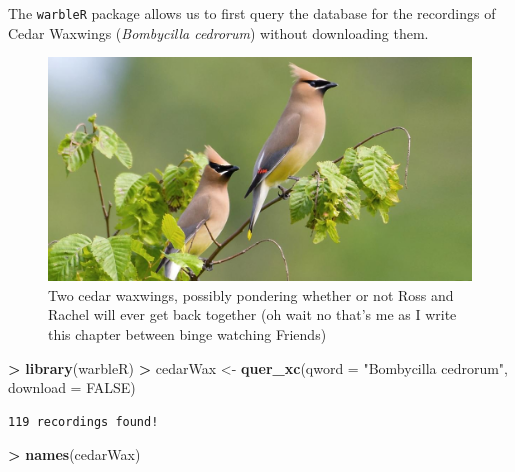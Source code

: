 \documentclass[
]{krantz}
\makeatletter
\newenvironment{Shaded}{\begin{snugshade}}{\end{snugshade}}
\newcommand{\DataTypeTok}[1]{\textcolor[rgb]{0.27,0.27,0.27}{#1}}
\newcommand{\KeywordTok}[1]{\textcolor[rgb]{0.27,0.27,0.27}{\textbf{#1}}}
\newcommand{\NormalTok}[1]{#1}
\newcommand{\OperatorTok}[1]{\textcolor[rgb]{0.43,0.43,0.43}{\textbf{#1}}}
\newcommand{\OtherTok}[1]{\textcolor[rgb]{0.37,0.37,0.37}{#1}}
\newcommand{\StringTok}[1]{\textcolor[rgb]{0.5,0.5,0.5}{#1}}
\newenvironment{kframe}{%
\medskip{}
\setlength{\fboxsep}{.8em}
 \def\at@end@of@kframe{}%
 \ifinner\ifhmode%
  \def\at@end@of@kframe{\end{minipage}}%
  \begin{minipage}{\columnwidth}%
 \fi\fi%
 \def\FrameCommand##1{\hskip\@totalleftmargin \hskip-\fboxsep
 \colorbox{shadecolor}{##1}\hskip-\fboxsep
     \hskip-\linewidth \hskip-\@totalleftmargin \hskip\columnwidth}%
 \MakeFramed {\advance\hsize-\width
   \@totalleftmargin\z@ \linewidth\hsize
   \@setminipage}}%
 {\par\unskip\endMakeFramed%
 \at@end@of@kframe}
\renewenvironment{Shaded}{\begin{kframe}}{\end{kframe}}
\makeatother
\begin{document}
The \texttt{warbleR} package allows us to first query the database for the recordings of Cedar Waxwings (\emph{Bombycilla cedrorum}) without downloading them.

\begin{figure}
\includegraphics[width=1\linewidth]{figures/cedarWaxwing} \caption{Two cedar waxwings, possibly pondering whether or not Ross and Rachel will ever get back together (oh wait no that's me as I write this chapter between binge watching Friends)}\label{fig:waxwing}
\end{figure}

\begin{Shaded}
\begin{Highlighting}[]
\OperatorTok{\textgreater{}}\StringTok{ }\KeywordTok{library}\NormalTok{(warbleR)}
\OperatorTok{\textgreater{}}\StringTok{ }\NormalTok{cedarWax \textless{}{-}}\StringTok{ }\KeywordTok{quer\_xc}\NormalTok{(}\DataTypeTok{qword =} \StringTok{"Bombycilla cedrorum"}\NormalTok{, }\DataTypeTok{download =} \OtherTok{FALSE}\NormalTok{)}
\end{Highlighting}
\end{Shaded}

\begin{verbatim}
119 recordings found!
\end{verbatim}

\begin{Shaded}
\begin{Highlighting}[]
\OperatorTok{\textgreater{}}\StringTok{ }\KeywordTok{names}\NormalTok{(cedarWax)}
\end{Highlighting}
\end{Shaded}
\end{document}
